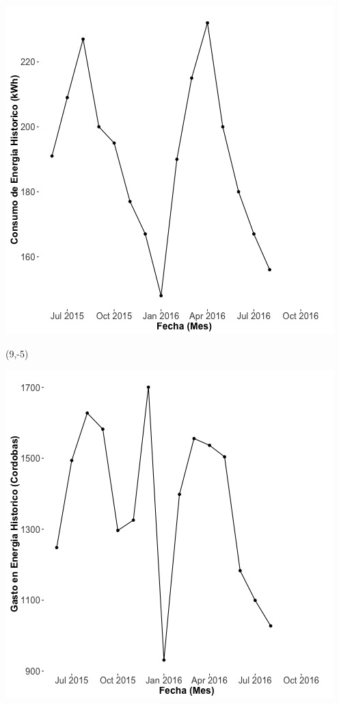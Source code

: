 \documentclass{article}\usepackage[]{graphicx}\usepackage[]{color}
\newenvironment{knitrout}{}{} %
\begin{document}
\begin{knitrout}
\color{fgcolor}
\includegraphics[scale=0.65]{figure/A25_historico_energia} 
\end{knitrout}

 \begin{textblock}{1}(9,-5)
\begin{minipage}{20em}
\begingroup

\endgroup
\end{minipage}
\end{textblock}

\begin{knitrout}
\color{fgcolor}
\includegraphics[scale=0.65]{figure/A25_historico_cordobas} 
\end{knitrout}
\end{document}
